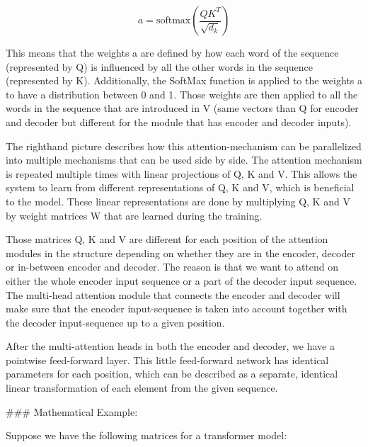 \begin{equation}
a = \text{softmax}\left(\frac{QK^T}{\sqrt{d_k}}\right)
\end{equation}



This means that the weights a are defined by how each word of the sequence (represented by Q) is influenced by all the other words in the sequence (represented by K). Additionally, the SoftMax function is applied to the weights a to have a distribution between 0 and 1. Those weights are then applied to all the words in the sequence that are introduced in V (same vectors than Q for encoder and decoder but different for the module that has encoder and decoder inputs).

The righthand picture describes how this attention-mechanism can be parallelized into multiple mechanisms that can be used side by side. The attention mechanism is repeated multiple times with linear projections of Q, K and V. This allows the system to learn from different representations of Q, K and V, which is beneficial to the model. These linear representations are done by multiplying Q, K and V by weight matrices W that are learned during the training.

Those matrices Q, K and V are different for each position of the attention modules in the structure depending on whether they are in the encoder, decoder or in-between encoder and decoder. The reason is that we want to attend on either the whole encoder input sequence or a part of the decoder input sequence. The multi-head attention module that connects the encoder and decoder will make sure that the encoder input-sequence is taken into account together with the decoder input-sequence up to a given position.

After the multi-attention heads in both the encoder and decoder, we have a pointwise feed-forward layer. This little feed-forward network has identical parameters for each position, which can be described as a separate, identical linear transformation of each element from the given sequence.

### Mathematical Example:

Suppose we have the following matrices for a transformer model:

